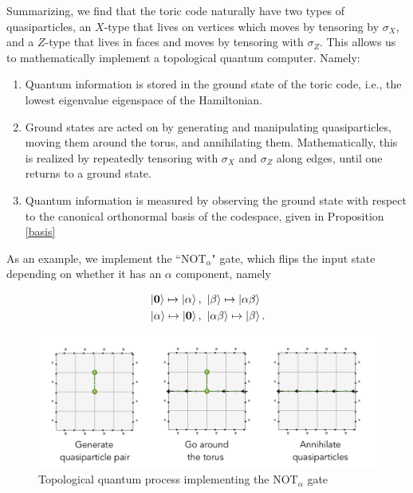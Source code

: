 \documentclass{article}
\theoremstyle{definition}
\numberwithin{figure}{section}
\begin{document}
Summarizing, we find that the toric code naturally have two types of quasiparticles, an $X$-type that lives on vertices which moves by tensoring by $\sigma_X$, and a $Z$-type that lives in faces and moves by tensoring with $\sigma_Z$. This allows us to mathematically implement a topological quantum computer. Namely:

\begin{enumerate}
\item Quantum information is stored in the ground state of the toric code, i.e., the lowest eigenvalue eigenspace of the Hamiltonian.
\item Ground states are acted on by generating and manipulating quasiparticles, moving them around the torus, and annihilating them. Mathematically, this is realized by repeatedly tensoring with $\sigma_X$ and $\sigma_Z$ along edges, until one returns to a ground state.
\item Quantum information is measured by observing the ground state with respect to the canonical orthonormal basis of the codespace, given in Proposition \ref{basis}
\end{enumerate}


As an example, we implement the ``$\text{NOT}_\alpha$" gate, which flips the input state depending on whether it has an $\alpha$ component, namely

\begin{align*}
&\left|\bold{0}\right> \mapsto \left|\alpha\right>,\,\,  \left|\beta\right> \mapsto \left|\alpha\beta\right> \\
&\left|\alpha\right> \mapsto \left|\bold{0}\right>,\,\, \left|\alpha\beta\right> \mapsto \left|\beta\right>.
\end{align*}

\begin{figure}
\begin{center}
\includegraphics[scale=0.45]{not-alpha-gate}
\caption{Topological quantum process implementing the $\text{NOT}_{\alpha}$ gate}
\label{fig:not-alpha-gate}
\end{center}
\end{figure}
\end{document}
